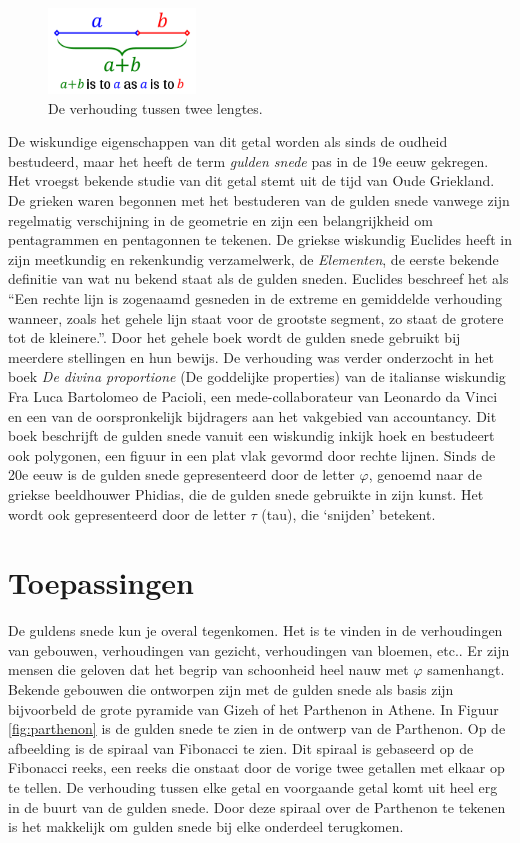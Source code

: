 \documentclass{article}
\begin{document}
\begin{figure}[Hh]
	\centering
	\includegraphics[width=0.35\textwidth]{golden-ratio-line.png}
	\caption{De verhouding tussen twee lengtes.}
	\label{fig:ratio-lines}
\end{figure}

De wiskundige eigenschappen van dit getal worden als sinds de oudheid bestudeerd, maar het heeft de term \textit{gulden snede} pas in de 19e eeuw gekregen. Het vroegst bekende studie van dit getal stemt uit de tijd van Oude Griekland. De grieken waren begonnen met het bestuderen van de gulden snede vanwege zijn regelmatig verschijning in de geometrie en zijn een belangrijkheid om pentagrammen en pentagonnen te tekenen. De griekse wiskundig Euclides heeft in zijn meetkundig en rekenkundig verzamelwerk, de \textit{Elementen}, de eerste bekende definitie van wat nu bekend staat als de gulden sneden. Euclides beschreef het als ``Een rechte lijn is zogenaamd gesneden in de extreme en gemiddelde verhouding wanneer, zoals het gehele lijn staat voor de grootste segment, zo staat de grotere tot de kleinere.''. Door het gehele boek wordt de gulden snede gebruikt bij meerdere stellingen en hun bewijs. De verhouding was verder onderzocht in het boek \textit{De divina proportione} (De goddelijke properties) van de italianse wiskundig Fra Luca Bartolomeo de Pacioli, een mede-collaborateur van Leonardo da Vinci en een van de oorspronkelijk bijdragers aan het vakgebied van accountancy. Dit boek beschrijft de gulden snede vanuit een wiskundig inkijk hoek en bestudeert ook polygonen, een figuur in een plat vlak gevormd door rechte lijnen. Sinds de 20e eeuw is de gulden snede gepresenteerd door de letter \(\varphi\), genoemd naar de griekse beeldhouwer Phidias, die de gulden snede gebruikte in zijn kunst. Het wordt ook gepresenteerd door de letter \(\tau\) (tau), die `snijden' betekent.

\section{Toepassingen}

De guldens snede kun je overal tegenkomen. Het is te vinden in de verhoudingen van gebouwen, verhoudingen van gezicht, verhoudingen van bloemen, etc.. Er zijn mensen die geloven dat het begrip van schoonheid heel nauw met \(\varphi\) samenhangt. Bekende gebouwen die ontworpen zijn met de gulden snede als basis zijn bijvoorbeld de grote pyramide van Gizeh of het Parthenon in Athene. In Figuur \ref{fig:parthenon} is de gulden snede te zien in de ontwerp van de Parthenon. Op de afbeelding is de spiraal van Fibonacci te zien. Dit spiraal is gebaseerd op de Fibonacci reeks, een reeks die onstaat door de vorige twee getallen met elkaar op te tellen. De verhouding tussen elke getal en voorgaande getal komt uit heel erg in de buurt van de gulden snede. Door deze spiraal over de Parthenon te tekenen is het makkelijk om gulden snede bij elke onderdeel terugkomen.
\end{document}
